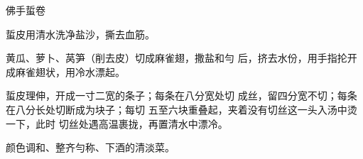 \begin{recipe}{佛手蜇卷}

\ingredients


\cooking

\step 	蜇皮用清水洗净盐沙，撕去血筋。

\step 	黄瓜、萝卜、莴笋（削去皮）切成麻雀翅，撒盐和勻 后，挤去水份，用手指抡开成麻雀翅状，用冷水漂起。

\step 蜇皮理伸，开成一寸二宽的条子；每条在八分宽处切 成丝，留四分宽不切；每条在八分长处切断成为块子；每切 五至六块重叠起，夹着没有切丝这一头入汤中烫一下，此时 切丝处遇高温裹拢，再置清水中漂冷。

\notes

颜色调和、整齐勻称、下酒的清淡菜。

\end{recipe}


